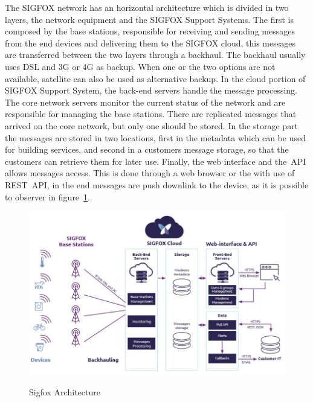 The SIGFOX network has an horizontal architecture which is divided in two layers, the network equipment and the SIGFOX Support Systems. The first is composed by the base stations, responsible for receiving and sending messages from the end devices and delivering them to the SIGFOX cloud, this messages are transferred between the two layers through a backhaul. The backhaul usually uses DSL and 3G or 4G as backup. When one or the two options are not available, satellite can also be used as alternative backup. In the cloud portion of SIGFOX Support System, the back-end servers handle the message processing. The core network servers monitor the current status of the network and are responsible for managing the base stations. There are replicated messages that arrived on the core network, but only one should be stored. In the storage part the messages are stored in  two locations, first in the metadata which can be used for building services, and second in a customers message storage, so that the customers can retrieve them for later use. Finally, the web interface and the~\gls{API} allows messages access. This is done through a web browser or the with use of REST~\gls{API}, in the end messages are  push downlink to the device, as it is possible to observer in figure~\ref{fig:Sigfox_Architecture}.\\

\begin{figure}[htbp]
  \centering
  
    {\includegraphics[height=3 in,width=0.75\linewidth]{Chapters/Figures/SigfoxArchitecture.JPG}}%
 
  \caption{Sigfox Architecture~\cite{SIGTECH}}
  \label{fig:Sigfox_Architecture}
\end{figure}

